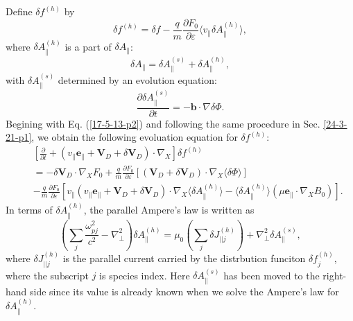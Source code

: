 \documentclass{llncs}
\begin{document}
Define $\delta f^{(h)}$ by
\begin{equation}
  \label{23-11-16-p1} \delta f^{(h)} = \delta f - \frac{q}{m} \frac{\partial
  F_0}{\partial \varepsilon} \langle v_{\parallel} \delta A_{\parallel}^{(h)}
  \rangle,
\end{equation}
where $\delta A_{\parallel}^{(h)}$ is a part of $\delta A_{\parallel}$:
\begin{equation}
  \delta A_{\parallel} = \delta A_{\parallel}^{(s)} + \delta
  A_{\parallel}^{(h)},
\end{equation}
with $\delta A_{\parallel}^{(s)}$ determined by an evolution equation:
\begin{equation}
  \label{23-11-16-2} \frac{\partial \delta A_{\parallel}^{(s)}}{\partial t} =
  -\mathbf{b} \cdot \nabla \delta \Phi .
\end{equation}
Begining with Eq. (\ref{17-5-13-p2}) and following the same procedure in Sec.
\ref{24-3-21-p1}, we obtain the following evoluation equation for $\delta
f^{(h)}$:
\begin{eqnarray}
  &  & \left[ \frac{\partial}{\partial t} + (v_{\parallel}
  \mathbf{e}_{\parallel} +\mathbf{V}_D + \delta \mathbf{V}_D) \cdot \nabla_X
  \right] \delta f^{(h)} \nonumber\\
  &  & = - \delta \mathbf{V}_D \cdot \nabla_X F_0 + \frac{q}{m}
  \frac{\partial F_0}{\partial \varepsilon} [(\mathbf{V}_D + \delta
  \mathbf{V}_D) \cdot \nabla_X \langle \delta \Phi \rangle] \nonumber\\
  &  & - \frac{q}{m} \frac{\partial F_0}{\partial \varepsilon} [v_{\parallel}
  (v_{\parallel} \mathbf{e}_{\parallel} +\mathbf{V}_D + \delta \mathbf{V}_D)
  \cdot \nabla_X \langle \delta A_{\parallel}^{(h)} \rangle - \langle \delta
  A_{\parallel}^{(h)} \rangle (\mu \mathbf{e}_{\parallel} \cdot \nabla_X B_0)]
  .  \label{17-6-21-3}
\end{eqnarray}
In terms of $\delta A_{\parallel}^{(h)}$, the parallel Ampere's law is written
as
\begin{equation}
  \label{23-12-4-1} \left( \sum_j \frac{\omega_{p j}^2}{c^2} -
  \nabla^2_{\perp} \right) \delta A_{\parallel}^{(h)} = \mu_0  \left( \sum_j
  \delta J_{||j}^{(h)} \right) + \nabla^2_{\perp} \delta A_{\parallel}^{(s)},
\end{equation}
where $\delta J_{|| j}^{(h)}$ is the parallel current carried by the
distrbution funciton $\delta f^{(h)}_j$, where the subscript $j$ is species
index. Here $\delta A_{\parallel}^{(s)}$ has been moved to the right-hand side
since its value is already known when we solve the Ampere's law for $\delta
A_{\parallel}^{(h)}$.
\end{document}
